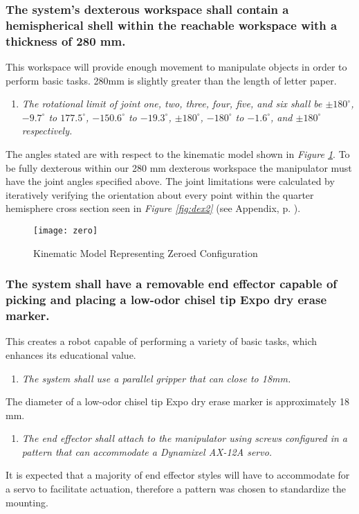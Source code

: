 \subsubsection{The system’s dexterous workspace shall contain a hemispherical shell within the reachable workspace with a thickness of 280 mm.}\label{sec:zero}
This workspace will provide enough movement to manipulate objects in order to perform basic tasks. 280mm is slightly greater than the length of letter paper.
\begin{enumerate}
  \item \textit{The rotational limit of joint one, two, three, four, five, and six shall be \(\pm180^{\circ}\), \(-9.7^{\circ}\) to \(177.5^{\circ}\), \(-150.6^{\circ}\) to \(-19.3^{\circ}\), \(\pm180^{\circ}\), \(-180^{\circ}\) to \(-1.6^{\circ}\), and \(\pm180^{\circ}\) respectively.}
\end{enumerate}
The angles stated are with respect to the kinematic model shown in \emph{Figure \ref{fig:zero}}. To be fully dexterous within our 280 mm dexterous workspace the manipulator must have the joint angles specified above. The joint limitations were calculated by iteratively verifying the orientation about every point within the quarter hemisphere cross section seen in \emph{Figure \ref{fig:dex2}} (see Appendix, p. \pageref{sec:app}).

  \begin{figure}[htp]
    \centering
    \texttt{[image: zero]}
    \caption[Kinematic Model Representing Zeroed Configuration]{Kinematic Model Representing Zeroed Configuration \cite{robo}}
    \label{fig:zero}
  \end{figure}
  
\subsubsection{The system shall have a removable end effector capable of picking and placing a low-odor chisel tip Expo dry erase marker.}
This creates a robot capable of performing a variety of basic tasks, which enhances its educational value.
\begin{enumerate}
  \item \textit{The system shall use a parallel gripper that can close to 18mm.}
\end{enumerate}
The diameter of a low-odor chisel tip Expo dry erase marker is approximately 18 mm.
\begin{enumerate}[resume]
  \item \textit{The end effector shall attach to the manipulator using screws configured in a pattern that can accommodate a Dynamixel AX-12A servo.}
\end{enumerate}
It is expected that a majority of end effector styles will have to accommodate for a servo to facilitate actuation, therefore a pattern was chosen to standardize the mounting.


